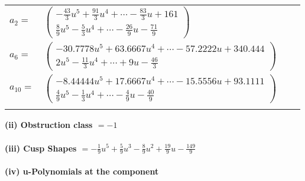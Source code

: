 \documentclass[1p]{elsarticle_modified}
\theoremstyle{definition}
\begin{document}
\begin{tabular}{m{7pt} m{180pt} m{7pt} m{180pt} }
\flushright $a_{2}=$&$\begin{pmatrix}-\frac{43}{3} u^5+\frac{91}{3} u^4+\cdots-\frac{83}{3} u+161\\\frac{8}{9} u^5-\frac{5}{3} u^4+\cdots-\frac{26}{9} u-\frac{71}{9}\end{pmatrix}$ \\
\flushright $a_{6}=$&$\begin{pmatrix}-30.7778 u^{5}+63.6667 u^{4}+\cdots-57.2222 u+340.444\\2 u^5-\frac{11}{3} u^4+\cdots+9 u-\frac{46}{3}\end{pmatrix}$ \\
\flushright $a_{10}=$&$\begin{pmatrix}-8.44444 u^{5}+17.6667 u^{4}+\cdots-15.5556 u+93.1111\\\frac{4}{9} u^5-\frac{1}{3} u^4+\cdots-\frac{4}{9} u-\frac{40}{9}\end{pmatrix}$\\&\end{tabular}
\flushleft \textbf{(ii) Obstruction class $= -1$}\\~\\
\flushleft \textbf{(iii) Cusp Shapes $= -\frac{1}{9} u^5+\frac{5}{9} u^3-\frac{8}{9} u^2+\frac{19}{9} u-\frac{149}{9}$}\\~\\
\newpage\renewcommand{\arraystretch}{1}
\flushleft \textbf{(iv) u-Polynomials at the component}\newline \\
\end{document}
